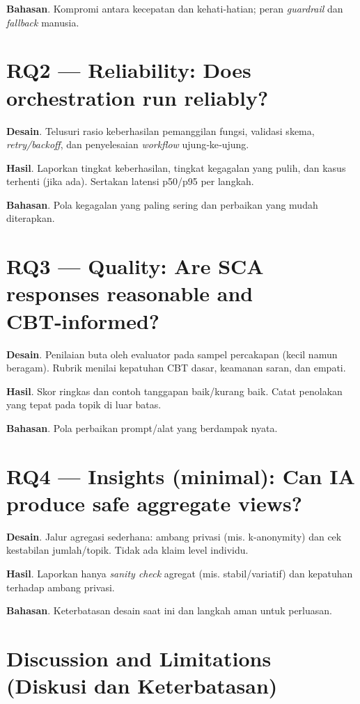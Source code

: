 \textbf{Bahasan}. Kompromi antara kecepatan dan kehati‑hatian; peran \textit{guardrail} dan \textit{fallback} manusia.

\section{RQ2 — Reliability: Does orchestration run reliably?}
\label{sec:rq2}

\textbf{Desain}. Telusuri rasio keberhasilan pemanggilan fungsi, validasi skema, \textit{retry/backoff}, dan penyelesaian \textit{workflow} ujung‑ke‑ujung.

\textbf{Hasil}. Laporkan tingkat keberhasilan, tingkat kegagalan yang pulih, dan kasus terhenti (jika ada). Sertakan latensi p50/p95 per langkah.

\textbf{Bahasan}. Pola kegagalan yang paling sering dan perbaikan yang mudah diterapkan.

\section{RQ3 — Quality: Are SCA responses reasonable and CBT‑informed?}
\label{sec:rq3}

\textbf{Desain}. Penilaian buta oleh evaluator pada sampel percakapan (kecil namun beragam). Rubrik menilai kepatuhan CBT dasar, keamanan saran, dan empati.

\textbf{Hasil}. Skor ringkas dan contoh tanggapan baik/kurang baik. Catat penolakan yang tepat pada topik di luar batas.

\textbf{Bahasan}. Pola perbaikan prompt/alat yang berdampak nyata.

\section{RQ4 — Insights (minimal): Can IA produce safe aggregate views?}
\label{sec:rq4}

\textbf{Desain}. Jalur agregasi sederhana: ambang privasi (mis. k‑anonymity) dan cek kestabilan jumlah/topik. Tidak ada klaim level individu.

\textbf{Hasil}. Laporkan hanya \textit{sanity check} agregat (mis. stabil/variatif) dan kepatuhan terhadap ambang privasi.

\textbf{Bahasan}. Keterbatasan desain saat ini dan langkah aman untuk perluasan.

\section{Discussion and Limitations (Diskusi dan Keterbatasan)}
\label{sec:discussion}

